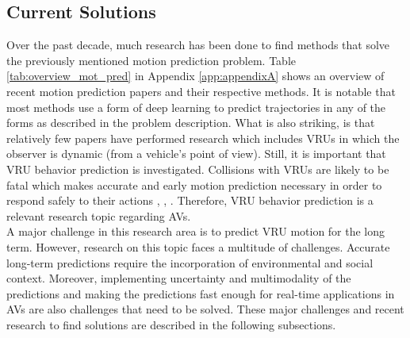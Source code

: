 \subsection{Current Solutions}
Over the past decade, much research has been done to find methods that solve the previously mentioned motion prediction problem. Table \ref{tab:overview_mot_pred} in Appendix \ref{app:appendixA} shows an overview of recent motion prediction papers and their respective methods. It is notable that most methods use a form of deep learning to predict trajectories in any of the forms as described in the problem description. What is also striking, is that relatively few papers have performed research which includes \glspl{VRU} in which the observer is dynamic (from a vehicle's point of view). Still, it is important that \gls{VRU} behavior prediction is investigated. Collisions with \glspl{VRU} are likely to be fatal which makes accurate and early motion prediction necessary in order to respond safely to their actions \cite{rehder2018pedestrian}, \cite{chou2020predicting}, \cite{uah2020d4}. Therefore, \gls{VRU} behavior prediction is a relevant research topic regarding \glspl{AV}.\\
A major challenge in this research area is to predict \gls{VRU} motion for the long term. However, research on this topic faces a multitude of challenges. Accurate long-term predictions require the incorporation of environmental and social context. Moreover, implementing uncertainty and multimodality of the predictions and making the predictions fast enough for real-time applications in \glspl{AV} are also challenges that need to be solved. These major challenges and recent research to find solutions are described in the following subsections. 


